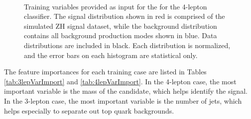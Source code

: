 {\begin{figure}[h!]
 \\
\caption{Training variables provided as input for the for the 4-lepton classifier. The signal distribution shown in red is comprised of the simulated ZH signal dataset, while the background distribution contains all background production modes shown in blue. Data distributions are included in black. Each distribution is normalized, and the error bars on each histogram are statistical only. }
\label{fig:hmm4lepVars}
\end{figure}
\clearpage
}




The feature importances for each training case are listed in Tables \ref{tab:3lepVarImport} and \ref{tab:4lepVarImport}.
In the 4-lepton case, the most important variable is the mass of the \Z candidate, which helps identify the signal.
In the 3-lepton case, the most important variable is the number of jets, which helps especially to separate out top quark backgrounds.

